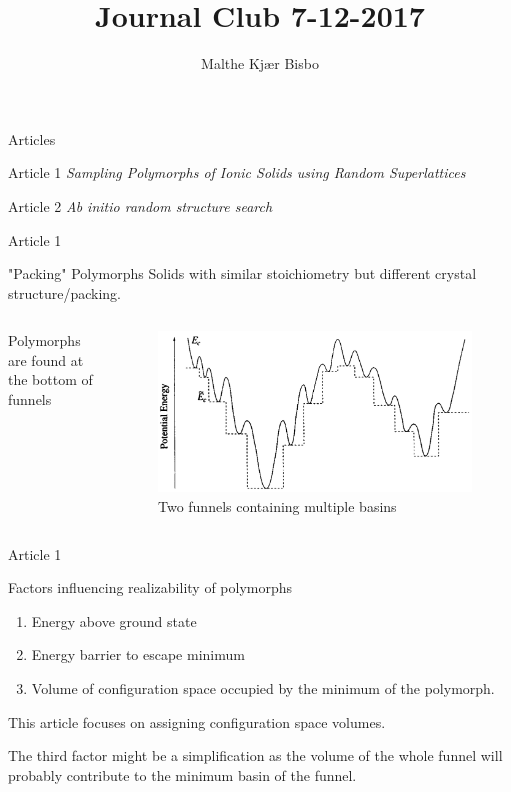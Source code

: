 \documentclass{beamer}
\title{Journal Club 7-12-2017}
\author{Malthe Kj\ae r Bisbo}
\begin{document}
\begin{frame}
	\titlepage
\end{frame}

\begin{frame}{Articles}
	\begin{block}{Article 1}
		\textit{Sampling Polymorphs of Ionic Solids using Random Superlattices}
	\end{block}
	\begin{block}{Article 2}
		\textit{Ab initio random structure search}
	\end{block}
\end{frame}

\begin{frame}{Article 1}
\begin{block}{"Packing" Polymorphs}
	Solids with similar stoichiometry  but different crystal structure/packing.
\end{block}
\begin{columns}
	Polymorphs are found at the bottom of funnels
	
	\begin{figure}
		\centering
		\includegraphics[width=0.9\linewidth]{Funnel_of_basins}
		\caption{Two funnels containing multiple basins}
		\label{fig:funnelofbasins}
	\end{figure}
\end{columns}
\end{frame}

\begin{frame}{Article 1}
\begin{block}{Factors influencing realizability of polymorphs}
	\begin{enumerate}
		\item Energy above ground state
		\item Energy barrier to escape minimum
		\item Volume of configuration space occupied by the minimum of the polymorph.
	\end{enumerate}
\end{block}
This article focuses on assigning configuration space volumes.
\bigskip

The third factor might be a simplification as the volume of the whole funnel will probably contribute to the minimum basin of the funnel.
\end{frame}
\end{document}
